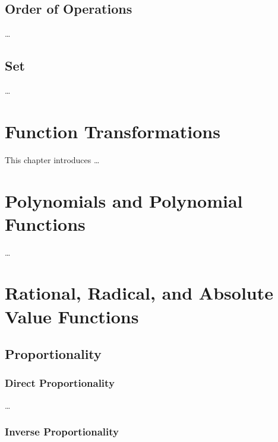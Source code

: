 \documentclass[
]{book}
\theoremstyle{definition}
\theoremstyle{definition}
\theoremstyle{definition}
\theoremstyle{definition}
\theoremstyle{remark}
\begin{document}
\hypertarget{order-of-operations}{%
\section{Order of Operations}\label{order-of-operations}}

\ldots{}

\hypertarget{set}{%
\section{Set}\label{set}}

\ldots{}

\hypertarget{function-transformations}{%
\chapter{Function Transformations}\label{function-transformations}}

This chapter introduces \ldots{}

\hypertarget{polynomials-and-polynomial-functions}{%
\chapter{Polynomials and Polynomial Functions}\label{polynomials-and-polynomial-functions}}

\ldots{}

\hypertarget{rational-radical-and-absolute-value-functions}{%
\chapter{Rational, Radical, and Absolute Value Functions}\label{rational-radical-and-absolute-value-functions}}

\hypertarget{proportionality}{%
\section{Proportionality}\label{proportionality}}

\hypertarget{direct-proportionality}{%
\subsection{Direct Proportionality}\label{direct-proportionality}}

\ldots{}

\hypertarget{inverse-proportionality}{%
\subsection{Inverse Proportionality}\label{inverse-proportionality}}
\end{document}
